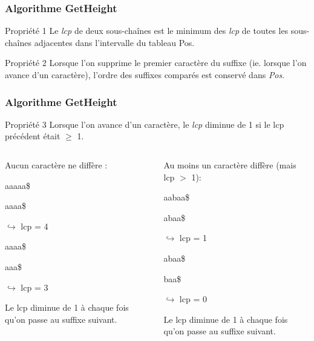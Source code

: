 \documentclass[10pt]{beamer}
\begin{document}
\begin{frame}
  \frametitle{Algorithme GetHeight}

  \begin{block}{Propriété 1}
  Le \textit{lcp} de deux sous-chaînes est le minimum des \textit{lcp} de
  toutes les sous-chaînes adjacentes dans l'intervalle du tableau Pos.
  \end{block}
  \begin{block}{Propriété 2}
  Lorsque l'on supprime le premier caractère du suffixe (ie. lorsque l'on
  avance d'un caractère), l'ordre des suffixes comparés est conservé dans
  \textit{Pos}.
  \end{block}
\end{frame}

\begin{frame}

  \frametitle{Algorithme GetHeight}
  
  
  \begin{block}{Propriété 3}
    Lorsque l'on avance d'un caractère, le \textit{lcp} diminue de 1
    si le lcp précédent était $\geq$ 1. 
  \end{block}
  
  \pause

  \begin{columns}
    \begin{column}{.48\textwidth}
      
      Aucun caractère ne diffère :
      
      aaaaa\$

      aaaa\$

      $\hookrightarrow$ lcp = 4

      aaaa\$

      aaa\$

      $\hookrightarrow$ lcp = 3

      
      Le lcp diminue de 1 à chaque fois qu'on passe au suffixe suivant.
      
    \end{column}%
    \hfill%
    \pause
    \begin{column}{.48\textwidth}
        
      Au moins un caractère diffère (mais lcp $>$ 1):
      
        aabaa\$

        abaa\$

        $\hookrightarrow$ lcp = 1

        abaa\$

        baa\$

        $\hookrightarrow$ lcp = 0
        
        Le lcp diminue de 1 à chaque fois qu'on passe au suffixe suivant.
        
      \end{column}%
      \end{columns}
  
\end{frame}
\end{document}
